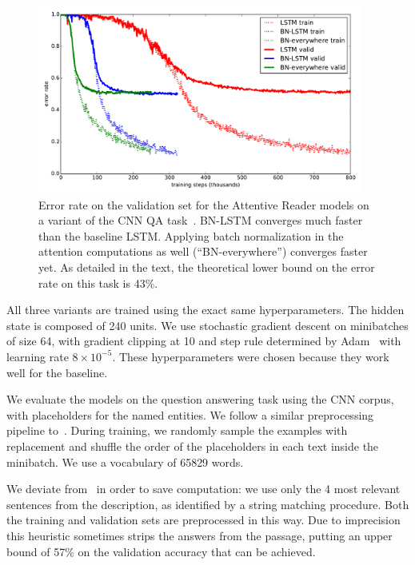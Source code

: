 \documentclass{article} %
\begin{document}
\begin{figure}[!ht]
\center
\includegraphics[width=0.95\textwidth]{figures/attr_valid.pdf}
\caption{
Error rate on the validation set for the Attentive Reader models on a variant of the CNN QA task~\cite{attentivereader}.
BN-LSTM converges much faster than the baseline LSTM.
Applying batch normalization in the attention computations as well (``BN-everywhere'') converges faster yet.
As detailed in the text, the theoretical lower bound on the error rate on this task is 43\%.
}
\label{fig:attr_valid}
\end{figure}

All three variants are trained using the exact same hyperparameters.
The hidden state is composed of 240 units.
We use stochastic gradient descent on minibatches of size 64,
with gradient clipping at 10 and step rule determined by Adam~\cite{kingma2014adam}
with learning rate $8 \times 10^{-5}$.
These hyperparameters were chosen because they work well for the baseline.

We evaluate the models on the question answering task using the CNN corpus, with placeholders for the named entities. We follow a similar preprocessing pipeline to~\cite{attentivereader}.
During training, we randomly sample the examples with replacement and shuffle the order of the placeholders in each text inside the minibatch.
We use a vocabulary of 65829 words.

We deviate from~\cite{attentivereader} in order to save computation:
we use only the 4 most relevant sentences from the description,
as identified by a string matching procedure.
Both the training and validation sets are preprocessed in this way.
Due to imprecision this heuristic sometimes strips the answers from the passage,
putting an upper bound of 57\% on the validation accuracy that can be achieved.
\end{document}
